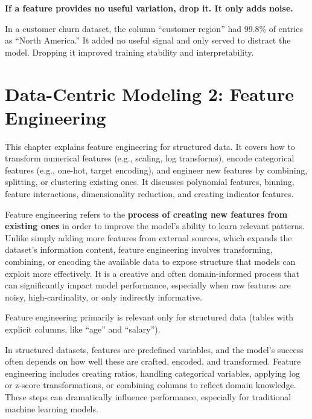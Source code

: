 \documentclass[12pt,openany]{book}
\begin{document}
\textbf{If a feature provides no useful variation, drop it. It only adds noise.}

\begin{examplebox}
In a customer churn dataset, the column “customer region” had 99.8\% of entries as “North America.” It added no useful signal and only served to distract the model. Dropping it improved training stability and interpretability.
\end{examplebox}




\chapter{Data-Centric Modeling 2: Feature Engineering}

\begin{summarybox}
This chapter explains feature engineering for structured data. It covers how to transform numerical features (e.g., scaling, log transforms), encode categorical features (e.g., one-hot, target encoding), and engineer new features by combining, splitting, or clustering existing ones. It discusses polynomial features, binning, feature interactions, dimensionality reduction, and creating indicator features.
\end{summarybox}

Feature engineering refers to the \textbf{process of creating new features from existing ones} in order to improve the model’s ability to learn relevant patterns. Unlike simply adding more features from external sources, which expands the dataset’s information content, feature engineering involves transforming, combining, or encoding the available data to expose structure that models can exploit more effectively. It is a creative and often domain-informed process that can significantly impact model performance, especially when raw features are noisy, high-cardinality, or only indirectly informative.
\newline

\begin{notebox}
    Feature engineering primarily is relevant only for structured data (tables with explicit columns, like ``age'' and ``salary'').
\end{notebox}

In structured datasets, features are predefined variables, and the model's success often depends on how well these are crafted, encoded, and transformed. Feature engineering includes creating ratios, handling categorical variables, applying log or z-score transformations, or combining columns to reflect domain knowledge. These steps can dramatically influence performance, especially for traditional machine learning models.
\newline
\end{document}
